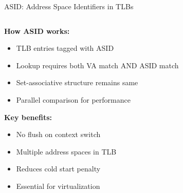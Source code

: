 \documentclass[aspectratio=169,12pt]{beamer}
\begin{document}
\begin{frame}{ASID: Address Space Identifiers in TLBs}
\begin{columns}[T]
\begin{column}{0.52\textwidth}
\textbf{How ASID works:}
\begin{itemize}
\item TLB entries tagged with ASID
\item Lookup requires both VA match AND ASID match
\item Set-associative structure remains same
\item Parallel comparison for performance
\end{itemize}

\textbf{Key benefits:}
\begin{itemize}
\item No flush on context switch
\item Multiple address spaces in TLB
\item Reduces cold start penalty
\item Essential for virtualization
\end{itemize}
\end{column}
\end{columns}
\end{frame}

\end{document}
